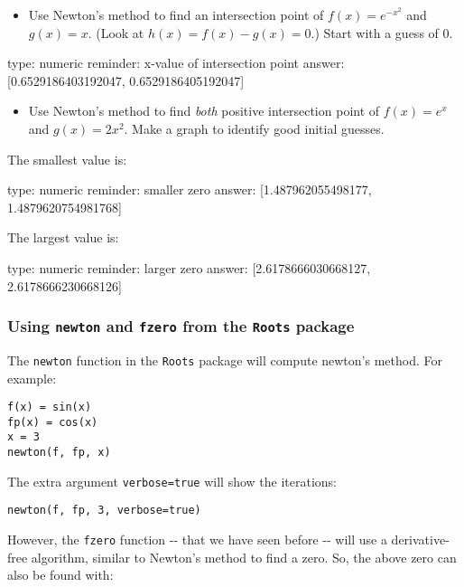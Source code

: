 \documentclass[12pt]{article}
\begin{document}
\begin{itemize}
\itemsep1pt\parskip0pt
\item
  Use Newton's method to find an intersection point of
  $f(x) =   e^{-x^2}$ and $g(x)=x$. (Look at $h(x) = f(x) - g(x) = 0$.)
  Start with a guess of $0$.
\end{itemize}

\begin{answer}
    type: numeric
    reminder: x-value of intersection point
    answer: [0.6529186403192047, 0.6529186405192047]

\end{answer}

\begin{itemize}
\itemsep1pt\parskip0pt
\item
  Use Newton's method to find \emph{both} positive intersection point of
  $f(x) = e^x$ and $g(x) = 2x^2$. Make a graph to identify good initial
  guesses.
\end{itemize}

The smallest value is:

\begin{answer}
    type: numeric
    reminder: smaller zero
    answer: [1.487962055498177, 1.4879620754981768]

\end{answer}

The largest value is:

\begin{answer}
    type: numeric
    reminder: larger zero
    answer: [2.6178666030668127, 2.6178666230668126]

\end{answer}

\subsubsection{Using \texttt{newton} and \texttt{fzero} from the
\texttt{Roots} package}

The \texttt{newton} function in the \texttt{Roots} package will compute
newton's method. For example:



\begin{verbatim}
f(x) = sin(x)
fp(x) = cos(x)
x = 3
newton(f, fp, x)
\end{verbatim}
The extra argument \texttt{verbose=true} will show the iterations:



\begin{verbatim}
newton(f, fp, 3, verbose=true)
\end{verbatim}
However, the \texttt{fzero} function -{}- that we have seen before -{}-
will use a derivative-free algorithm, similar to Newton's method to find
a zero. So, the above zero can also be found with:
\end{document}
